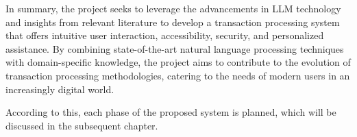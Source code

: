 \vspace{3mm}

\noindent
In summary, the project seeks to leverage the advancements in LLM technology and insights from relevant literature to develop a transaction processing system that offers intuitive user interaction, accessibility, security, and personalized assistance. By combining state-of-the-art natural language processing techniques with domain-specific knowledge, the project aims to contribute to the evolution of transaction processing methodologies, catering to the needs of modern users in an increasingly digital world.

\vspace{3mm}

\noindent
According to this, each phase of the proposed system is planned, which will be discussed in the subsequent chapter.

